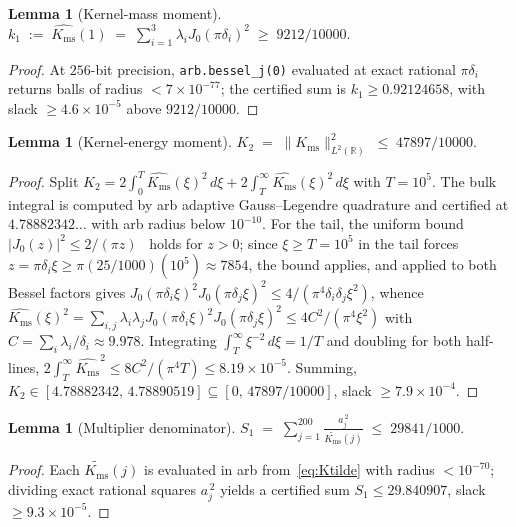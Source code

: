 \documentclass[11pt, letterpaper]{article}
\theoremstyle{paperplain}
\newtheorem{lemma}[theorem]{Lemma}
\theoremstyle{paperdef}
\newcommand{\R}{\mathbb{R}}
\newcommand{\Kms}{K_{\mathrm{ms}}}
\begin{document}
\begin{lemma}[Kernel-mass moment]
\label{lem:k1}
\(
  k_1 \;:=\; \widehat{\Kms}(1)
  \;=\; \sum_{i=1}^{3}\lambda_i J_0(\pi\delta_i)^2
  \;\ge\; 9212/10000.
\)
\end{lemma}

\begin{proof}
At $256$-bit precision, \texttt{arb.bessel\_j(0)} evaluated at exact
rational $\pi\delta_i$ returns balls of radius $<7\times 10^{-77}$;
the certified sum is $k_1\ge 0.92124658$, with slack
$\ge 4.6\times 10^{-5}$ above $9212/10000$.
\end{proof}

\begin{lemma}[Kernel-energy moment]
\label{lem:K2}
\(
  K_2 \;=\; \|\Kms\|_{L^2(\R)}^{2}
  \;\le\; 47897/10000.
\)
\end{lemma}

\begin{proof}
Split
$K_2 = 2\int_0^{T}\widehat{\Kms}(\xi)^2\,d\xi
+ 2\int_{T}^{\infty}\widehat{\Kms}(\xi)^2\,d\xi$ with $T=10^{5}$.
The bulk integral is computed by arb adaptive Gauss--Legendre
quadrature and certified at $4.78882342\ldots$ with arb radius
below $10^{-10}$.  For the tail, the uniform bound
$|J_0(z)|^2\le 2/(\pi z)$~\cite{Landau} holds for $z>0$;
since $\xi\ge T=10^{5}$ in the tail forces $z=\pi\delta_i\xi\ge
\pi(25/1000)(10^{5})\approx 7854$, the bound applies, and applied to
both Bessel factors gives
$J_0(\pi\delta_i\xi)^2 J_0(\pi\delta_j\xi)^2
\le 4/(\pi^4\delta_i\delta_j\xi^2)$, whence
$\widehat{\Kms}(\xi)^2 = \sum_{i,j}\lambda_i\lambda_j
   J_0(\pi\delta_i\xi)^2 J_0(\pi\delta_j\xi)^2
\le 4C^2/(\pi^4\xi^2)$ with
$C=\sum_i\lambda_i/\delta_i\approx 9.978$.  Integrating
$\int_T^\infty \xi^{-2}\,d\xi = 1/T$ and doubling for both half-lines,
$2\int_T^\infty\widehat{\Kms}^2 \le 8C^2/(\pi^4 T) \le 8.19\times 10^{-5}$.
Summing,
$K_2\in[4.78882342,\,4.78890519]\subseteq[0,\,47897/10000]$, slack
$\ge 7.9\times 10^{-4}$.
\end{proof}

\begin{lemma}[Multiplier denominator]
\label{lem:S1}
\(
  S_1 \;=\;
  \sum_{j=1}^{200}\frac{a_j^{\,2}}{\widetilde{\Kms}(j)}
  \;\le\; 29841/1000.
\)
\end{lemma}

\begin{proof}
Each $\widetilde{\Kms}(j)$ is evaluated in arb from~\eqref{eq:Ktilde}
with radius $<10^{-70}$; dividing exact rational squares $a_j^{\,2}$
yields a certified sum $S_1\le 29.840907$, slack
$\ge 9.3\times 10^{-5}$.
\end{proof}
\end{document}
